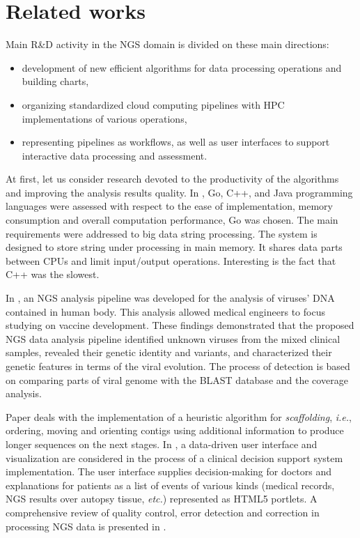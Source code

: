 \documentclass[a4paper]{jpconf}
\begin{document}
\section{Related works}
\label{sec:relworks}

Main R\&D activity in the NGS domain is divided on these main directions:
\begin{itemize}
\item development of new efficient algorithms for data processing operations and building charts,
\item organizing standardized cloud computing pipelines with HPC implementations of various operations,
\item representing pipelines as workflows, as well as user interfaces to support interactive data processing and assessment.
\end{itemize}

At first, let us consider research devoted to the productivity of the algorithms and improving the analysis results quality.  In \cite{const19}, Go, C++, and Java programming languages were assessed with respect to the ease of implementation, memory consumption and overall computation performance, Go was chosen. The main requirements were addressed to big data string processing. The system is designed to store string under processing in main memory. It shares data parts between CPUs and limit input/output operations. Interesting is the fact that C++ was the slowest.

In \cite{Gong16}, an NGS analysis pipeline was developed for the analysis of viruses' DNA contained in human body. This analysis allowed medical engineers to focus studying on vaccine development. These findings demonstrated that the proposed NGS data analysis pipeline identified unknown viruses from the mixed clinical samples, revealed their genetic identity and variants, and characterized their genetic features in terms of the viral evolution. The process of detection is based on comparing parts of viral genome with the BLAST database and the coverage analysis.

Paper \cite{grass12} deals with the implementation of a heuristic algorithm for \emph{scaffolding}, \emph{i.e.}, ordering, moving and orienting contigs using additional information to produce longer sequences on the next stages.
In \cite{muller16}, a data-driven user interface and visualization are considered in the process of a clinical decision support system implementation. The user interface supplies decision-making for doctors and explanations for patients as a list of events of various kinds (medical records, NGS results over autopsy tissue, \emph{etc.}) represented as HTML5 portlets. A comprehensive review of quality control, error detection and correction in processing NGS data is presented in \cite{te16}. %
\end{document}

